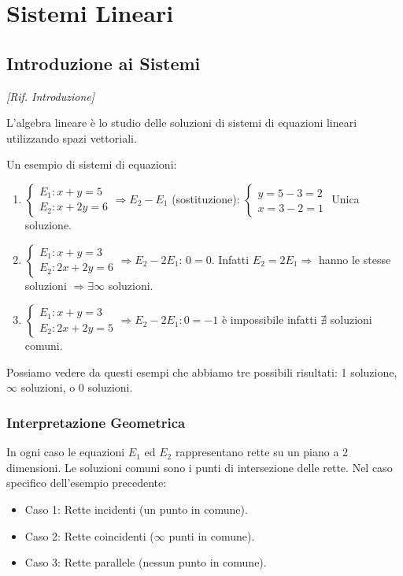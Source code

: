\section{Sistemi Lineari}

\subsection{Introduzione ai Sistemi}
\emph{[Rif. Introduzione]}

L'algebra lineare è lo studio delle soluzioni di sistemi di equazioni lineari utilizzando spazi vettoriali.

\begin{exercisebox}[title={Esempio 1.1: Sistemi di Equazioni}]
Un esempio di sistemi di equazioni:
\begin{enumerate}
    \item
    $\begin{cases}
    	E_1: x + y = 5 \\ E_2: x + 2y = 6
    \end{cases}
	\Rightarrow E_2 - E_1$ (sostituzione):
	$\begin{cases}
		y = 5 - 3 = 2 \\ x = 3 - 2 = 1
	\end{cases}$ 
	Unica soluzione.
    \item 
    $\begin{cases}
    	E_1: x + y = 3 \\ E_2: 2x + 2y = 6
    \end{cases}
	\Rightarrow E_2 - 2E_1$: $0 = 0$.
    Infatti $E_2 = 2E_1 \Rightarrow$ hanno le stesse soluzioni $\Rightarrow \exists \infty$ soluzioni.
    \item 
    $\begin{cases}
    	E_1: x + y = 3 \\ E_2: 2x + 2y = 5
    \end{cases}
	\Rightarrow E_2 - 2E_1: 0 = -1$ è impossibile infatti $\nexists$ soluzioni comuni.
\end{enumerate}
Possiamo vedere da questi esempi che abbiamo tre possibili risultati: 1 soluzione, $\infty$ soluzioni, o 0 soluzioni.
\end{exercisebox}

\subsubsection{Interpretazione Geometrica}
In ogni caso le equazioni $E_1$ ed $E_2$ rappresentano rette su un piano a 2 dimensioni. Le soluzioni comuni sono i punti di intersezione delle rette.
Nel caso specifico dell'esempio precedente:
\begin{itemize}
    \item Caso 1: Rette incidenti (un punto in comune).
    \item Caso 2: Rette coincidenti ($\infty$ punti in comune).
    \item Caso 3: Rette parallele (nessun punto in comune).
\end{itemize}

